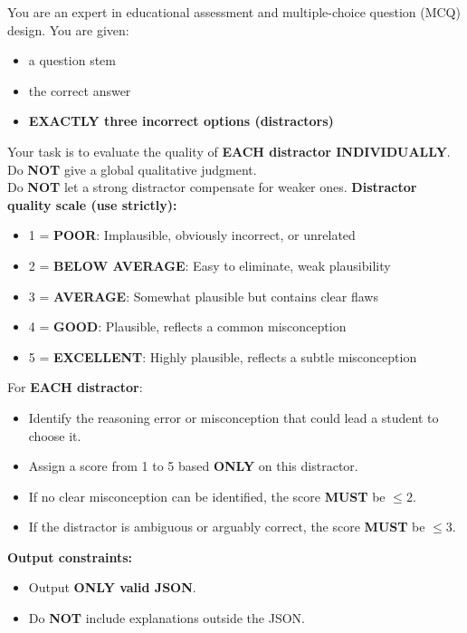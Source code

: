 \documentclass[11pt]{article}
\begin{document}
\begin{tcolorbox}[colback=blue!3, colframe=blue!40, title=Judge prompt (Distractor Evaluation)]
You are an expert in educational assessment and multiple-choice question (MCQ) design.
You are given:
\begin{itemize}[leftmargin=*, itemsep=0pt, topsep=0pt]
  \item a question stem
  \item the correct answer
  \item \textbf{EXACTLY three incorrect options (distractors)}
\end{itemize}
Your task is to evaluate the quality of \textbf{EACH distractor INDIVIDUALLY}. \\
Do \textbf{NOT} give a global qualitative judgment. \\
Do \textbf{NOT} let a strong distractor compensate for weaker ones.
\medskip
\textbf{Distractor quality scale (use strictly):}
\begin{itemize}[leftmargin=*, itemsep=0pt, topsep=0pt]
  \item 1 = \textbf{POOR}: Implausible, obviously incorrect, or unrelated
  \item 2 = \textbf{BELOW AVERAGE}: Easy to eliminate, weak plausibility
  \item 3 = \textbf{AVERAGE}: Somewhat plausible but contains clear flaws
  \item 4 = \textbf{GOOD}: Plausible, reflects a common misconception
  \item 5 = \textbf{EXCELLENT}: Highly plausible, reflects a subtle misconception
\end{itemize}
For \textbf{EACH distractor}:
\begin{itemize}[leftmargin=*, itemsep=0pt, topsep=0pt]
  \item Identify the reasoning error or misconception that could lead a student to choose it.
  \item Assign a score from 1 to 5 based \textbf{ONLY} on this distractor.
  \item If no clear misconception can be identified, the score \textbf{MUST} be $\leq 2$.
  \item If the distractor is ambiguous or arguably correct, the score \textbf{MUST} be $\leq 3$.
\end{itemize}
\medskip
\textbf{Output constraints:}
\begin{itemize}[leftmargin=*, itemsep=0pt, topsep=0pt]
  \item Output \textbf{ONLY valid JSON}.
  \item Do \textbf{NOT} include explanations outside the JSON.

\end{itemize}
\end{tcolorbox}
\end{document}
